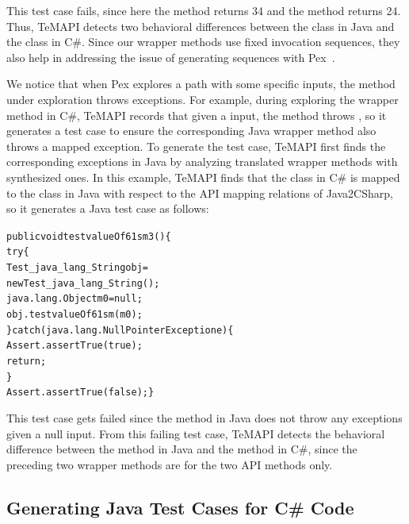 This test case fails, since here the  method returns 34 and the  method returns 24. Thus, TeMAPI detects two behavioral differences between the  class in Java and the  class in C\#. Since our wrapper methods use fixed invocation sequences, they also help in addressing the issue of generating sequences with Pex~\cite{thummalapenta09:mseqgen}.

We notice that when Pex explores a path with some specific inputs, the method under exploration throws exceptions.
For example, during exploring the  wrapper method in C\#, TeMAPI records that given a  input, the method throws , so it generates a test case to ensure the corresponding Java wrapper method also throws a mapped exception. To generate the test case, TeMAPI first finds the corresponding exceptions in Java by analyzing translated wrapper methods with synthesized ones. In this example, TeMAPI finds that the  class in C\# is mapped to the  class in Java with respect to the API mapping relations of Java2CSharp, so it generates a Java test case as follows:

\begin{CodeOut}\vspace*{-1.5ex}
\begin{alltt}
 public void testvalueOf61sm3()\{
   try\{
     Test_java_lang_String obj =
           new Test_java_lang_String();
     java.lang.Object m0 = null;
     obj.testvalueOf61sm(m0);
   \}catch(java.lang.NullPointerException e)\{
     Assert.assertTrue(true);
     return;
   \}
   Assert.assertTrue(false); \}
\end{alltt}
\end{CodeOut}\vspace*{-1ex}

This test case gets failed since the  method in Java does not throw any exceptions given a null input.
From this failing test case, TeMAPI detects the behavioral difference between the  method in Java and the  method in C\#, since the preceding two wrapper methods are for the two API methods only.

\subsection{Generating Java Test Cases for C\# Code}

